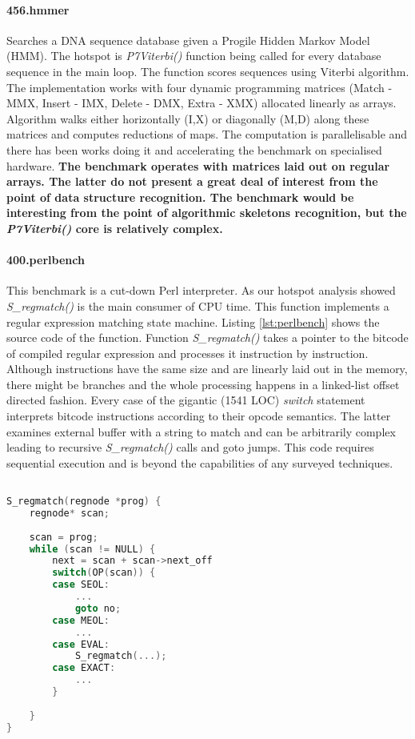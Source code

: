 \documentclass[10pt,a4paper]{report}
\begin{document}
\paragraph{456.hmmer} Searches a DNA sequence database given a Progile Hidden Markov Model (HMM). The hotspot is \textit{P7Viterbi()} function being called for every database sequence in the main loop. The function scores sequences using Viterbi algorithm. The implementation works with four dynamic programming matrices (Match - MMX, Insert - IMX, Delete - DMX, Extra - XMX) allocated linearly as arrays. Algorithm walks either horizontally (I,X) or diagonally (M,D) along these matrices and computes reductions of maps. The computation is parallelisable and there has been works doing it \cite{Ganesan:2010:AHG:1854776.1854844}\cite{inria} and accelerating the benchmark on specialised hardware.\newline\null
\quad\textbf{The benchmark operates with matrices laid out on regular arrays. The latter do not present a great deal of interest from the point of data structure recognition. The benchmark would be interesting from the point of algorithmic skeletons recognition, but the \textit{P7Viterbi()} core is relatively complex.} 

\paragraph{400.perlbench} This benchmark is a cut-down Perl interpreter. As our hotspot analysis showed \textit{S\_regmatch()} is the main consumer of CPU time. This function implements a regular expression matching state machine. Listing \ref{lst:perlbench} shows the source code of the function. Function \textit{S\_regmatch()} takes a pointer to the bitcode of compiled regular expression and processes it instruction by instruction. Although instructions have the same size and are linearly laid out in the memory, there might be branches and the whole processing happens in a linked-list offset directed fashion. Every case of the gigantic (1541 LOC) \textit{switch} statement interprets bitcode instructions according to their opcode semantics. The latter examines external buffer with a string to match and can be arbitrarily complex leading to recursive \textit{S\_regmatch()} calls and goto jumps. This code requires sequential execution and is beyond the capabilities of any surveyed techniques.
\begin{minipage}[t]{\linewidth}
\begin{lstlisting}[caption={\textbf{regexec.c(2296)}: Regular expression matching state machine},label={lst:perlbench},language=C]

S_regmatch(regnode *prog) {
    regnode* scan;
    
    scan = prog;
    while (scan != NULL) {
        next = scan + scan->next_off
        switch(OP(scan)) {
        case SEOL:
            ...
            goto no;
        case MEOL:
            ...
        case EVAL:
            S_regmatch(...);
        case EXACT:
            ...
        }
    
    }
}
\end{lstlisting}
\end{minipage}
\end{document}
